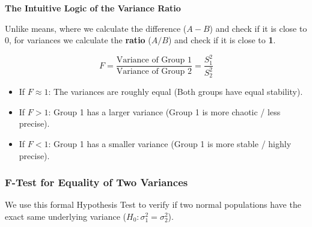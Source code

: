\vspace{0.2cm}
\begin{example}{\textbf{The Intuitive Logic of the Variance Ratio}}

Unlike means, where we calculate the difference ($A - B$) and check if it is close to $0$, for variances we calculate the \textbf{ratio} ($A / B$) and check if it is close to \textbf{1}.

$$ F = \frac{\text{Variance of Group 1}}{\text{Variance of Group 2}} = \frac{S_1^2}{S_2^2} $$

\begin{itemize}
    \item If $F \approx 1$: The variances are roughly equal (Both groups have equal stability).
    \item If $F > 1$: Group 1 has a larger variance (Group 1 is more chaotic / less precise).
    \item If $F < 1$: Group 1 has a smaller variance (Group 1 is more stable / highly precise).
\end{itemize}
\end{example}

\subsubsection{F-Test for Equality of Two Variances}

We use this formal Hypothesis Test to verify if two normal populations have the exact same underlying variance ($H_0: \sigma_1^2 = \sigma_2^2$). 


